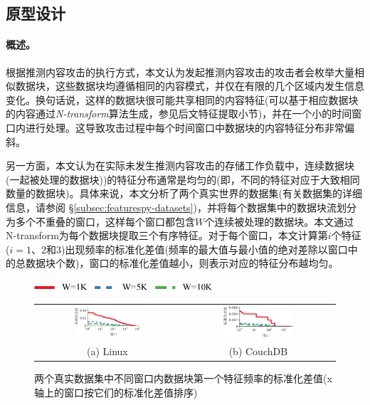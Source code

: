\subsection{原型设计}
\label{subsec:featurespy-basic}

\paragraph*{概述。}

根据推测内容攻击的执行方式，本文认为发起推测内容攻击的攻击者会枚举大量相似数据块，这些数据块均遵循相同的内容模式，并仅在有限的几个区域内发生信息变化。换句话说，这样的数据块很可能共享相同的内容特征(可以基于相应数据块的内容通过\textit{N-transform}\cite{shilane12}算法生成，参见后文特征提取小节)，并在一个小的时间窗口内进行处理。这导致攻击过程中每个时间窗口中数据块的内容特征分布非常偏斜。

另一方面，本文认为在实际未发生推测内容攻击的存储工作负载中，连续数据块(一起被处理的数据块)\cite{zhu2008avoiding})的特征分布通常是均匀的(即，不同的特征对应于大致相同数量的数据块)。具体来说，本文分析了两个真实世界的数据集(有关数据集的详细信息，请参阅 \S\ref{subsec:featurespy-datasets})，并将每个数据集中的数据块流划分为多个不重叠的窗口，这样每个窗口都包含$W$个连续被处理的数据块。本文通过N-transform\cite{shilane12}为每个数据块提取三个有序特征。对于每个窗口，本文计算第$i$个特征($i=1$、$2$和$3$)出现频率的标准化差值(频率的最大值与最小值的绝对差除以窗口中的总数据块个数)，窗口的标准化差值越小，则表示对应的特征分布越均匀。

\begin{figure}[!htb]
    \centering
    \includegraphics[height=3mm]{pic/featurespy/plot/featureDistribution/featureDistributionLegend.pdf}
    \begin{tabular}{cc}
        \includegraphics[width=0.477\textwidth]{pic/featurespy/plot/featureDistribution/featureDistributionLinux.pdf} &
        \includegraphics[width=0.477\textwidth]{pic/featurespy/plot/featureDistribution/featureDistributionCouchbase.pdf}                    \\
        {\small (a) Linux}                                                                                            & {\small (b) CouchDB} \\
    \end{tabular}
    \caption{两个真实数据集中不同窗口内数据块第一个特征频率的标准化差值(x轴上的窗口按它们的标准化差值排序)}
    \label{fig:featurespy-featureDistribution}
\end{figure}

